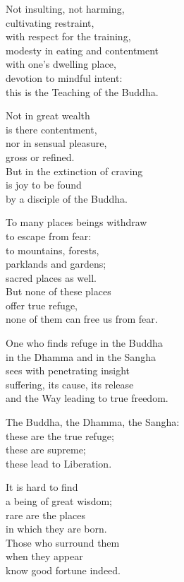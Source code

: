 Not insulting, not harming,\\
cultivating restraint,\\
with respect for the training,\\
modesty in eating and contentment\\
with one's dwelling place,\\
devotion to mindful intent:\\
this is the Teaching of the Buddha.


Not in great wealth\\
is there contentment,\\
nor in sensual pleasure,\\
gross or refined.\\
But in the extinction of craving\\
is joy to be found\\
by a disciple of the Buddha.


To many places beings withdraw\\
to escape from fear:\\
to mountains, forests,\\
parklands and gardens;\\
sacred places as well.\\
But none of these places\\
offer true refuge,\\
none of them can free us from fear.


One who finds refuge in the Buddha\\
in the Dhamma and in the Sangha\\
sees with penetrating insight\\
suffering, its cause, its release\\
and the Way leading to true freedom.


The Buddha, the Dhamma, the Sangha:\\
these are the true refuge;\\
these are supreme;\\
these lead to Liberation.


It is hard to find\\
a being of great wisdom;\\
rare are the places\\
in which they are born.\\
Those who surround them\\
when they appear\\
know good fortune indeed.


